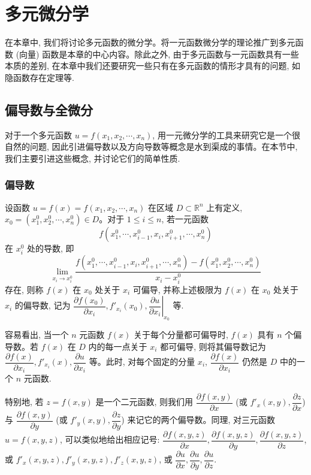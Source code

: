 \setcounter{chapter}{13} %
\chapter{多元微分学}
\label{chap:ma-14}

在本章中, 我们将讨论多元函数的微分学。将一元函数微分学的理论推广到多元函数 (向量) 函数是本章的中心内容。除此之外, 由于多元函数与一元函数具有一些本质的差别, 在本章中我们还要研究一些只有在多元函数的情形才具有的问题, 如隐函数存在定理等.

\section{偏导数与全微分}
\label{sec:ma-14-1}

对于一个多元函数 $u=f(x_1,x_2,\cdots,x_n)$, 用一元微分学的工具来研究它是一个很自然的问题, 因此引进偏导数以及方向导数等概念是水到渠成的事情。在本节中, 我们主要引进这些概念, 并讨论它们的简单性质.

\subsection{偏导数}
\label{subsec:ma-14-1-1}

\begin{definition}\label{definition:ma-14-1-1}
设函数 $u=f(x)=f(x_1,x_2,\cdots,x_n)$ 在区域 $D\subset\mathbb R^n$ 上有定义, $x_0=(x_1^0,x_2^0,\cdots,x_n^0)\in D$。对于 $1\leqslant i\leqslant n$, 若一元函数
\[
  f(x_1^0,\cdots,x_{i-1}^0,x_i,x_{i+1}^0,\cdots,x_n^0)
\]
在 $x_i^0$ 处的导数, 即
\[
  \lim_{x_i\to x_i^0}
  \frac{f(x_1^0,\cdots,x_{i-1}^0,x_i,x_{i+1}^0,\cdots,x_n^0)
  -f(x_1^0,x_2^0,\cdots,x_n^0)}{x_i-x_i^0}
\]
存在, 则称 $f(x)$ 在 $x_0$ 处关于 $x_i$ 可偏导, 并称上述极限为 $f(x)$ 在 $x_0$ 处关于 $x_i$ 的偏导数, 记为 $\dfrac{\partial f(x_0)}{\partial x_i}, f'_{x_i}(x_0), \left.\dfrac{\partial u}{\partial x_i}\right|_{x_0}$ 等.
\end{definition}

容易看出, 当一个 $n$ 元函数 $f(x)$ 关于每个分量都可偏导时, $f(x)$ 具有 $n$ 个偏导数。若 $f(x)$ 在 $D$ 内的每一点关于 $x_i$ 都可偏导, 则将其偏导数记为 $\dfrac{\partial f(x)}{\partial x_i}, f'_{x_i}(x), \dfrac{\partial u}{\partial x_i}$ 等。此时, 对每个固定的分量 $x_i$, $\dfrac{\partial f(x)}{\partial x_i}$ 仍然是 $D$ 中的一个 $n$ 元函数.

特别地, 若 $z=f(x,y)$ 是一个二元函数, 则我们用 $\dfrac{\partial f(x,y)}{\partial x}$ (或 $f'_x(x,y), \dfrac{\partial z}{\partial x}$) 与 $\dfrac{\partial f(x,y)}{\partial y}$ (或 $f'_y(x,y), \dfrac{\partial z}{\partial y}$) 来记它的两个偏导数。同理, 对三元函数 $u=f(x,y,z)$, 可以类似地给出相应记号: $\dfrac{\partial f(x,y,z)}{\partial x}, \dfrac{\partial f(x,y,z)}{\partial y}, \dfrac{\partial f(x,y,z)}{\partial z}$, 或 $f'_x(x,y,z), f'_y(x,y,z), f'_z(x,y,z)$, 或 $\dfrac{\partial u}{\partial x}, \dfrac{\partial u}{\partial y}, \dfrac{\partial u}{\partial z}$.

